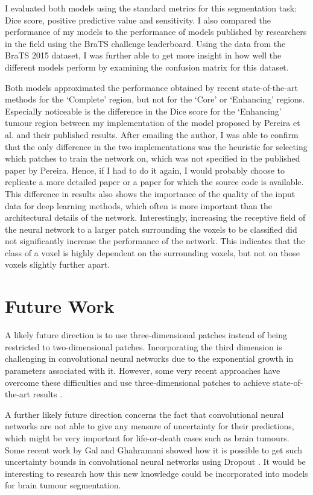 \documentclass[12pt,a4paper,twoside,openright]{report}
\begin{document}
I evaluated both models using the standard metrics for this segmentation task: Dice score, positive predictive value and sensitivity. I also compared the performance of my models to the performance of models published by researchers in the field using the BraTS challenge leaderboard. Using the data from the BraTS 2015 dataset, I was further able to get more insight in how well the different models perform by examining the confusion matrix for this dataset.

Both models approximated the performance obtained by recent state-of-the-art methods for the `Complete' region, but not for the `Core' or `Enhancing' regions. Especially noticeable is the difference in the Dice score for the `Enhancing' tumour region between my implementation of the model proposed  by Pereira et al. and their published results. After emailing the author, I was able to confirm that the only difference in the two implementations was the heuristic for selecting which patches to train the network on, which was not specified in the published paper by Pereira. Hence, if I had to do it again, I would probably choose to replicate a more detailed paper or a paper for which the source code is available. This difference in results also shows the importance of the quality of the input data for deep learning methods, which often is more important than the architectural details of the network. Interestingly, increasing the receptive field of the neural network to a larger patch surrounding the voxels to be classified did not significantly increase the performance of the network. This indicates that the class of a voxel is highly dependent on the surrounding voxels, but not on those voxels slightly further apart.

\section{Future Work}
A likely future direction is to use three-dimensional patches instead of being restricted to two-dimensional patches. Incorporating the third dimension is challenging in convolutional neural networks due to the exponential growth in parameters associated with it. However, some very recent approaches have overcome these difficulties and use three-dimensional patches to achieve state-of-the-art results \cite{kamnitsas}. 

A further likely future direction concerns the fact that convolutional neural networks are not able to give any measure of uncertainty for their predictions, which might be very important for life-or-death cases such as brain tumours. Some recent work by Gal and Ghahramani showed how it is possible to get such uncertainty bounds in convolutional neural networks using Dropout \cite{Gal2015Dropout}. It would be interesting to research how this new knowledge could be incorporated into models for brain tumour segmentation.
\end{document}
